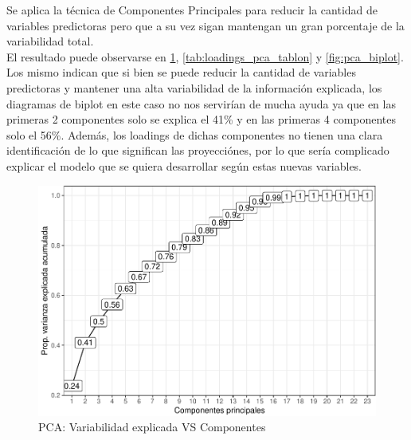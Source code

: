 Se aplica la técnica de Componentes Principales para reducir la cantidad de variables predictoras pero que a su vez sigan mantengan un gran porcentaje de la variabilidad total.\\
El resultado puede observarse en \ref{fig:pca_varexp_comp}, \ref{tab:loadings_pca_tablon} y \ref{fig:pca_biplot}. Los mismo indican que si bien se puede reducir la cantidad de variables
predictoras y mantener una alta variabilidad de la información
explicada, los diagramas de biplot en este caso no nos servirían de
mucha ayuda ya que en las primeras 2 componentes solo se explica el 41\%
y en las primeras 4 componentes solo el 56\%. Además, los loadings de
dichas componentes no tienen una clara identificación de lo que significan las proyecciónes, por lo que sería complicado explicar el modelo que se quiera desarrollar según estas nuevas variables.

\begin{figure}[!htb]
	\centering
	\includegraphics{imagenes/reduccion_dimension/unnamed-chunk-7-1.pdf}
	\caption{PCA: Variabilidad explicada VS Componentes}
	\label{fig:pca_varexp_comp}
\end{figure}



